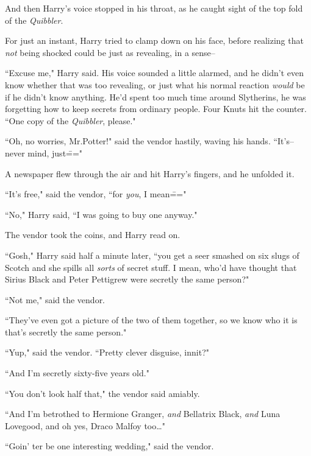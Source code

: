 And then Harry's voice stopped in his throat, as he caught sight of the top fold of the \emph{Quibbler}.


For just an instant, Harry tried to clamp down on his face, before realizing that \emph{not} being shocked could be just as revealing, in a sense\---

``Excuse me," Harry said. His voice sounded a little alarmed, and he didn't even know whether that was too revealing, or just what his normal reaction \emph{would} be if he didn't know anything. He'd spent too much time around Slytherins, he was forgetting how to keep secrets from ordinary people. Four Knuts hit the counter. ``One copy of the \emph{Quibbler}, please."

``Oh, no worries, Mr.\?Potter!" said the vendor hastily, waving his hands. ``It's\---never mind, just\==="

A newspaper flew through the air and hit Harry's fingers, and he unfolded it.


``It's free," said the vendor, ``for \emph{you}, I mean\==="

``No," Harry said, ``I was going to buy one anyway."

The vendor took the coins, and Harry read on.

``Gosh," Harry said half a minute later, ``you get a seer smashed on six slugs of Scotch and she spills all \emph{sorts} of secret stuff. I mean, who'd have thought that Sirius Black and Peter Pettigrew were secretly the same person?"

``Not me," said the vendor.

``They've even got a picture of the two of them together, so we know who it is that's secretly the same person."

``Yup," said the vendor. ``Pretty clever disguise, innit?"

``And I'm secretly sixty-five years old."

``You don't look half that," the vendor said amiably.

``And I'm betrothed to Hermione Granger, \emph{and} Bellatrix Black, \emph{and} Luna Lovegood, and oh yes, Draco Malfoy too{\ldots}"

``Goin' ter be one interesting wedding," said the vendor.

